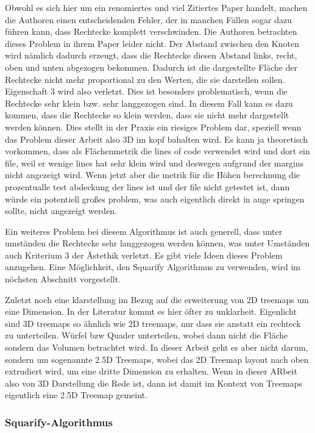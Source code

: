 Obwohl es sich hier um ein renomiertes und viel Zitiertes Paper handelt, machen die Authoren einen entscheidenden Fehler, der in manchen Fällen sogar dazu führen kann, dass Rechtecke komplett verschwinden. Die Authoren betrachten dieses Problem in ihrem Paper leider nicht. 
Der Abstand zwischen den Knoten wird nämlich dadurch erzeugt, dass die Rechtecke diesen Abstand links, recht, oben und unten abgezogen bekommen. Dadurch ist die dargestellte Fläche der Rechtecke nicht mehr proportional zu den Werten, die sie darstellen sollen. Eigenschaft 3 wird also verletzt. Dies ist besonders problematisch, wenn die Rechtecke sehr klein bzw. sehr langgezogen sind. In diesem Fall kann es dazu kommen, dass die Rechtecke so klein werden, dass sie nicht mehr dargestellt werden können. Dies stellt in der Praxis ein riesiges Problem dar, speziell wenn das Problem dieser Arbeit also 3D im kopf bahalten wird. Es kann ja theoretisch vorkommen, dass als Flächenmetrik die lines of code verwendet wird und dort ein file, weil er wenige lines hat sehr klein wird und deswegen aufgrund der margins nicht angezeigt wird. Wenn jetzt aber die metrik für die Höhen berechnung die prozentualle test abdeckung der lines ist und der file nicht getestet ist, dann würde ein potentiell großes problem, was auch eigentlich direkt in auge springen sollte, nicht angezeigt werden. 

Ein weiteres Problem bei diesem Algorithmus ist auch generell, dass unter umständen die Rechtecke sehr langgezogen werden können, was unter Umständen auch Kriterium 3 der Ästethik verletzt. Es gibt viele Ideen dieses Problem anzugehen. Eine Möglichkeit, den Squarify Algorithmus zu verwenden, wird im nöchsten Abschnitt vorgestellt.

Zuletzt noch eine klarstellung im Bezug auf die erweiterung von 2D treemaps um eine Dimension. In der Literatur kommt es hier öfter zu unklarheit. Eigenlicht sind 3D treemaps so ähnlich wie 2D treemaps, nur dass sie anstatt ein rechteck zu unterteilen. Würfel bzw Quader unterteilen, wobei dann nicht die Fläche sondern das Volumen betrachtet wird. In dieser Arbeit geht es aber nicht darum, sondern um sogenannte 2.5D Treemaps, wobei das 2D Treemap layout nach oben extrudiert wird, um eine dritte Dimension zu erhalten. Wenn in dieser ARbeit also von 3D Darstellung die Rede ist, dann ist damit im Kontext von Treemaps eigentlich eine 2.5D Treemap gemeint.

\subsubsection{Squarify-Algorithmus} \label{sec:Squarify}

